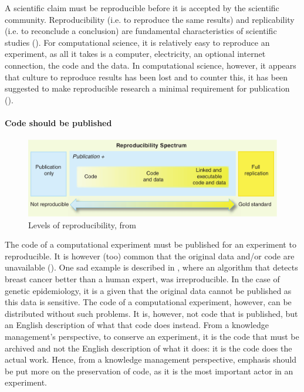 A scientific claim must be reproducible before it is accepted
by the scientific community.
Reproducibility (i.e. to reproduce the same results) 
and replicability (i.e. to reconclude a conclusion)
are fundamental characteristics of scientific studies (\cite{patil2019visual}).
For computational science, it is relatively easy to 
reproduce an experiment, as all it takes is a computer, electricity,
an optional internet connection, the code and the data.
In computational science, however, it appears that 
culture to reproduce results has been lost 
and to counter this, it has been suggested to make
reproducible research a minimal requirement for 
publication (\cite{peng2011reproducible}).

\paragraph{Code should be published}

\begin{figure}[!htbp]
  \centering
  \includegraphics[width=\linewidth]{peng2011reproducible_fig_1.png}
  \caption{
    Levels of reproducibility, from \cite{peng2011reproducible}
  }
  \label{fig:peng2011reproducible}
\end{figure}

The code of a computational experiment must be published
for an experiment to reproducible.
It is however (too) common that the original data
and/or code are unavailable (\cite{peng2021reproducible}).
One sad example is described in \cite{haibe2020importance}, where
an algorithm that detects breast cancer better than a human expert,
was irreproducible.
In the case of genetic epidemiology, it is a given that the original
data cannot be published as this data is sensitive.
The code of a computational experiment, however, can be
distributed without such problems.
It is, however, not code that is published, but an English
description of what that code does instead.
From a knowledge management's perspective,
to conserve an experiment,
it is the code that must be archived and not the
English description of what it does:
it is the code does the actual work.
Hence, from a knowledge management perspective, emphasis should be
put more on the preservation of code, as it is the most important actor
in an experiment.

